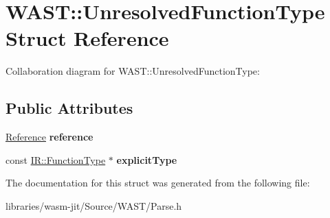\hypertarget{struct_w_a_s_t_1_1_unresolved_function_type}{}\section{W\+A\+ST\+:\+:Unresolved\+Function\+Type Struct Reference}
\label{struct_w_a_s_t_1_1_unresolved_function_type}


Collaboration diagram for W\+A\+ST\+:\+:Unresolved\+Function\+Type\+:
\subsection*{Public Attributes}
\begin{DoxyCompactItemize}
\item 
\mbox{\label{struct_w_a_s_t_1_1_unresolved_function_type_aa023cab7ce5852adb103b666f8e5a988}} 
\mbox{\hyperlink{struct_w_a_s_t_1_1_reference}{Reference}} {\bfseries reference}
\item 
\mbox{\label{struct_w_a_s_t_1_1_unresolved_function_type_ac15afbf3107440e51e7018d37f7fadff}} 
const \mbox{\hyperlink{struct_i_r_1_1_function_type}{I\+R\+::\+Function\+Type}} $\ast$ {\bfseries explicit\+Type}
\end{DoxyCompactItemize}


The documentation for this struct was generated from the following file\+:\begin{DoxyCompactItemize}
\item 
libraries/wasm-\/jit/\+Source/\+W\+A\+S\+T/Parse.\+h\end{DoxyCompactItemize}
